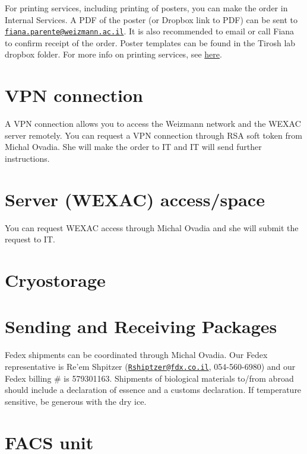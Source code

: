 \documentclass[
]{book}
\begin{document}
For printing services, including printing of posters, you can make the order in Internal Services. A PDF of the poster (or Dropbox link to PDF) can be sent to \href{mailto:fiana.parente@weizmann.ac.il}{\nolinkurl{fiana.parente@weizmann.ac.il}}. It is also recommended to email or call Fiana to confirm receipt of the order. Poster templates can be found in the Tirosh lab dropbox folder. For more info on printing services, see \href{https://www.weizmann.ac.il/RSD/units/design-photography-printing-branch/overview}{here}.

\hypertarget{vpn-connection}{%
\section{VPN connection}\label{vpn-connection}}

A VPN connection allows you to access the Weizmann network and the WEXAC server remotely. You can request a VPN connection through RSA soft token from Michal Ovadia. She will make the order to IT and IT will send further instructions.

\hypertarget{server-wexac-accessspace}{%
\section{Server (WEXAC) access/space}\label{server-wexac-accessspace}}

You can request WEXAC access through Michal Ovadia and she will submit the request to IT.

\hypertarget{cryostorage}{%
\section{Cryostorage}\label{cryostorage}}

\hypertarget{sending-and-receiving-packages}{%
\section{Sending and Receiving Packages}\label{sending-and-receiving-packages}}

Fedex shipments can be coordinated through Michal Ovadia. Our Fedex representative is Re'em Shpitzer (\href{mailto:Rshiptzer@fdx.co.il}{\nolinkurl{Rshiptzer@fdx.co.il}}, 054-560-6980) and our Fedex billing \# is 579301163. Shipments of biological materials to/from abroad should include a declaration of essence and a customs declaration. If temperature sensitive, be generous with the dry ice.

\hypertarget{facs-unit}{%
\section{FACS unit}\label{facs-unit}}
\end{document}
